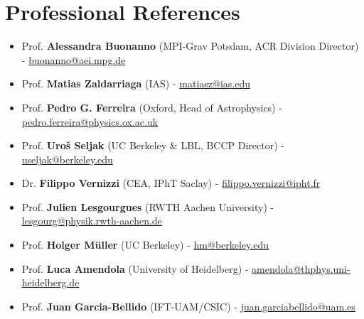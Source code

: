 \documentclass[11pt,a4paper]{article}
\newcounter{num}
\newcommand{\Num}{[\arabic{num}] \addtocounter{num}{1}}
\begin{document}
 



\section*{Professional References}
\begin{itemize}
\item Prof. \textbf{Alessandra Buonanno} (MPI-Grav Potsdam, ACR Division Director) - \url{buonanno@aei.mpg.de}
\item Prof. \textbf{Matias Zaldarriaga} (IAS) - \url{matiasz@ias.edu}
 \item Prof. \textbf{Pedro G. Ferreira} (Oxford, Head of Astrophysics) - \url{pedro.ferreira@physics.ox.ac.uk}
\item Prof. \textbf{Uro\v{s} Seljak} (UC Berkeley \& LBL, BCCP Director) - \url{useljak@berkeley.edu}
\item Dr. \textbf{Filippo Vernizzi} (CEA, IPhT Saclay) - \url{filippo.vernizzi@ipht.fr }
 \item Prof. \textbf{Julien Lesgourgues} (RWTH Aachen University) - \url{lesgourg@physik.rwth-aachen.de}
 \item Prof. \textbf{Holger M\"uller} (UC Berkeley) - \url{hm@berkeley.edu}
 \item Prof. \textbf{Luca Amendola} (University of Heidelberg) - \url{amendola@thphys.uni-heidelberg.de}
 \item Prof. \textbf{Juan Garcia-Bellido} (IFT-UAM/CSIC) - \url{juan.garciabellido@uam.es}
\end{itemize}
\end{document}
